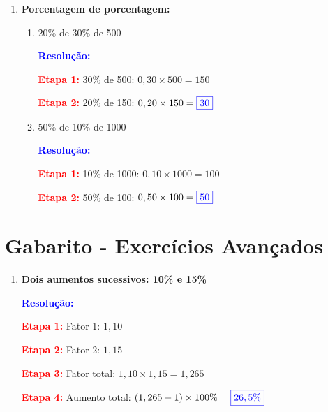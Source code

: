 \documentclass[11pt]{article}
\newcommand{\respostaNum}[1]{\textcolor{blue}{\boxed{#1}}}
\newcommand{\resolucao}{\textbf{\textcolor{blue}{Resolução:}}}
\begin{document}
\begin{multicols}{2}
\begin{enumerate}[leftmargin=*, start=9]
Total de pessoas: 500

\resolucao

\textbf{\textcolor{red}{Etapa 1:}} Setor vermelho (40\%): $0,40 \times 500 = \respostaNum{200}$

\textbf{\textcolor{red}{Etapa 2:}} Setor azul (20\%): $0,20 \times 500 = \respostaNum{100}$

\textbf{\textcolor{red}{Etapa 3:}} Setor verde (40\%): $0,40 \times 500 = \respostaNum{200}$

\item \textbf{Porcentagem de porcentagem:}

\begin{enumerate}[label=\alph*)]
\item 20\% de 30\% de 500

\resolucao

\textbf{\textcolor{red}{Etapa 1:}} 30\% de 500: $0,30 \times 500 = 150$

\textbf{\textcolor{red}{Etapa 2:}} 20\% de 150: $0,20 \times 150 = \respostaNum{30}$

\item 50\% de 10\% de 1000

\resolucao

\textbf{\textcolor{red}{Etapa 1:}} 10\% de 1000: $0,10 \times 1000 = 100$

\textbf{\textcolor{red}{Etapa 2:}} 50\% de 100: $0,50 \times 100 = \respostaNum{50}$
\end{enumerate}
\end{enumerate}

\section*{Gabarito - Exercícios Avançados}

\begin{enumerate}[leftmargin=*, start=15]

\item \textbf{Dois aumentos sucessivos: 10\% e 15\%}

\resolucao

\textbf{\textcolor{red}{Etapa 1:}} Fator 1: $1,10$

\textbf{\textcolor{red}{Etapa 2:}} Fator 2: $1,15$

\textbf{\textcolor{red}{Etapa 3:}} Fator total: $1,10 \times 1,15 = 1,265$

\textbf{\textcolor{red}{Etapa 4:}} Aumento total: $(1,265 - 1) \times 100\% = \respostaNum{26,5\%}$


\end{enumerate}
\end{multicols}
\end{document}
